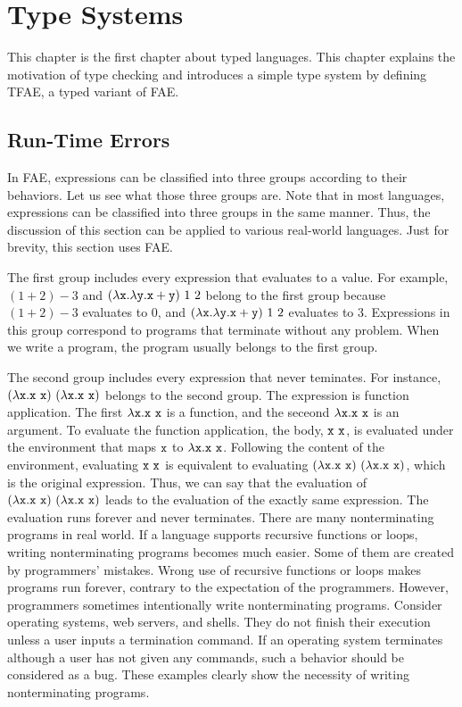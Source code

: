 
\chapter{Type Systems}

\renewcommand{\plang}{\textsf{FAE}\xspace}
\renewcommand{\Lang}{\textsf{TFAE}\xspace}

This chapter is the first chapter about typed languages. This chapter explains
the motivation of type checking and introduces a simple type
system by defining \Lang, a typed variant of \plang.

\section{Run-Time Errors}

In \plang, expressions can be classified into three groups according to their
behaviors. Let us see what those three groups are. Note that in most languages,
expressions can be classified into three groups in the same manner. Thus, the
discussion of this section can be applied to various real-world languages. Just
for brevity, this section uses \plang.

The first group includes every expression that evaluates to a value. For example,
$(1+2)-3$ and $(\lambda \cx.\lambda \cy.\cx+\cy)\ 1\ 2$ belong to the first
group because $(1+2)-3$ evaluates to $0$, and $(\lambda \texttt{x}.\lambda \texttt{y}.\texttt{x}+\texttt{y})\
1\ 2$ evaluates to $3$. Expressions in this group correspond to programs that
terminate without any problem. When we write a program, the program
usually belongs to the first group.

The second group includes every expression that never teminates. For instance,
$(\lambda \texttt{x}.\texttt{x}\ \texttt{x})\ (\lambda \texttt{x}.\texttt{x}\ \texttt{x})$ belongs to the second group.
The expression is function application. The first $\lambda \texttt{x}.\texttt{x}\ \texttt{x}$ is a
function, and the seceond $\lambda \texttt{x}.\texttt{x}\ \texttt{x}$ is an argument. To evaluate the
function application, the body, $\cx\ \cx$, is evaluated under the environment
that maps $\texttt{x}$ to $\lambda \texttt{x}.\texttt{x}\ \texttt{x}$. Following the content of the
environment, evaluating $\cx\ \cx$ is equivalent to evaluating $(\lambda
\texttt{x}.\texttt{x}\ \texttt{x})\ (\lambda \texttt{x}.\texttt{x}\ \texttt{x})$, which is the original expression. Thus,
we can say that the evaluation of $(\lambda \texttt{x}.\texttt{x}\ \texttt{x})\ (\lambda \texttt{x}.\texttt{x}\
\texttt{x})$ leads to the evaluation of the exactly same expression. The evaluation
runs forever and never terminates. There are many nonterminating programs in
real world. If a language supports recursive functions or loops, writing
nonterminating programs becomes much easier. Some of them are created by
programmers' mistakes. Wrong use of recursive functions or loops makes programs
run forever, contrary to the expectation of the programmers. However,
programmers sometimes intentionally write nonterminating programs.
Consider operating systems, web servers, and shells. They do not finish their
execution unless a user inputs a termination command. If an operating system
terminates although a user has not given any commands, such a behavior should
be considered as a bug. These examples clearly show the necessity of writing
nonterminating programs.

